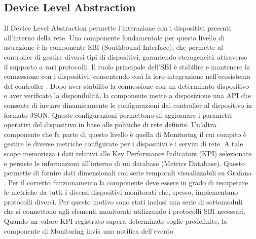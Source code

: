 \subsection{Device Level Abstraction}
Il Device Level Abstraction permette l'interazione con i dispositivi presenti all'interno della rete.
\newline Una componente fondamentale per questo livello di astrazione è la componente SBI (Southbound Interface), che permette al controller di gestire diversi tipi di dispositivi, garantendo eterogeneità attraverso il supporto a vari protocolli. 
Il ruolo principale dell'SBI è stabilire e mantenere la connessione con i dispositivi, consentendo così la loro integrazione nell'ecosistema del controller \cite{D32}. 
Dopo aver stabilito la connessione con un determinato dispositivo e aver verificato la disponibilità,
la componente mette a disposizione una API che consente di inviare dinamicamente le configurazioni dal controller al dispositivo in formato JSON.
Queste configurazioni permettono di aggiornare i parametri operativi del dispositivo in base alle politiche di rete definite.
\newline Un'altra componente che fa parte di questo livello è quella di Monitoring il cui compito è %
gestire le diverse metriche configurate per i dispositivi e i servizi di rete.
A tale scopo memorizza i dati relativi alle Key Performance Indicators (KPI) selezionate e persiste le informazioni all'interno di un database (Metrics Database).
Questo permette di fornire dati dimensionali con serie temporali visualizzabili su Grafana \cite{grafana}.
Per il corretto funzionamento la componente deve essere in grado di recuperare le metriche da tutti i diversi dispositivi monitorati che,
spesso, implementano protocolli diversi. Per questo motivo sono stati inclusi una serie di sottomoduli che si connettono 
agli elementi monitorati utilizzando i protocolli SBI necessari. %
\newline Quando un valore KPI registrato supera determinate soglie predefinite, la componente di Monitoring invia una notifica dell'evento 
